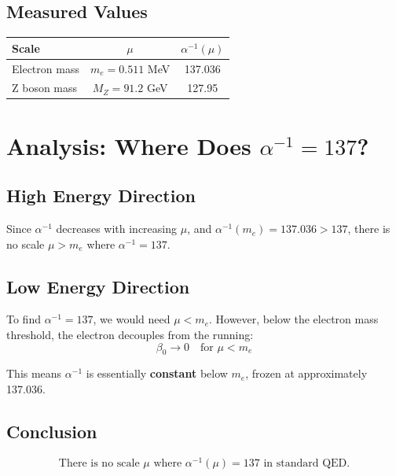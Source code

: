 \documentclass[11pt,a4paper]{article}
\begin{document}
\subsection{Measured Values}

\begin{center}
\begin{tabular}{|l|c|c|}
\hline
Scale & $\mu$ & $\alpha^{-1}(\mu)$ \\
\hline
Electron mass & $m_e = 0.511$ MeV & 137.036 \\
Z boson mass & $M_Z = 91.2$ GeV & 127.95 \\
\hline
\end{tabular}
\end{center}

\section{Analysis: Where Does $\alpha^{-1} = 137$?}

\subsection{High Energy Direction}

Since $\alpha^{-1}$ decreases with increasing $\mu$, and $\alpha^{-1}(m_e) = 137.036 > 137$, there is no scale $\mu > m_e$ where $\alpha^{-1} = 137$.

\subsection{Low Energy Direction}

To find $\alpha^{-1} = 137$, we would need $\mu < m_e$. However, below the electron mass threshold, the electron decouples from the running:
\begin{equation}
\beta_0 \to 0 \quad \text{for } \mu < m_e
\end{equation}

This means $\alpha^{-1}$ is essentially \textbf{constant} below $m_e$, frozen at approximately 137.036.

\subsection{Conclusion}

\begin{equation}
\boxed{\text{There is no scale } \mu \text{ where } \alpha^{-1}(\mu) = 137 \text{ in standard QED.}}
\end{equation}
\end{document}
